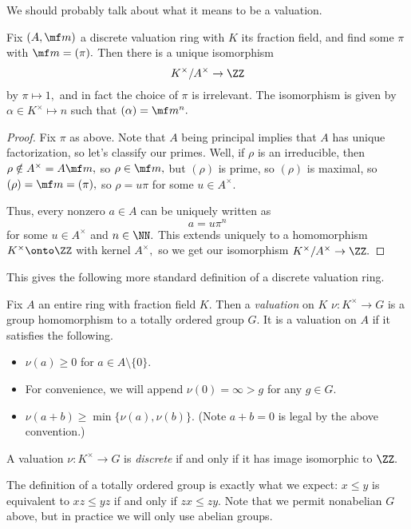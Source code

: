 \documentclass[../notes.tex]{subfiles}
\begin{document}
We should probably talk about what it means to be a valuation.
\begin{proposition} \label{prop:forwards}
    Fix $(A,\mf m)$ a discrete valuation ring with $K$ its fraction field, and find some $\pi$ with $\mf m=(\pi).$ Then there is a unique isomorphism
    \[K^\times/A^\times\to\ZZ\]
    by $\pi\mapsto1,$ and in fact the choice of $\pi$ is irrelevant. The isomorphism is given by $\alpha\in K^\times\longmapsto n$ such that $(\alpha)=\mf m^{n}.$
\end{proposition}
\begin{proof}
    Fix $\pi$ as above. Note that $A$ being principal implies that $A$ has unique factorization, so let's classify our primes. Well, if $\rho$ is an irreducible, then $\rho\notin A^\times=A\mf m,$ so $\rho\in\mf m,$ but $(\rho)$ is prime, so $(\rho)$ is maximal, so $(\rho)=\mf m=(\pi),$ so $\rho=u\pi$ for some $u\in A^\times.$

    Thus, every nonzero $a\in A$ can be uniquely written as
    \[a=u\pi^n\]
    for some $u\in A^\times$ and $n\in\NN.$ This extends uniquely to a homomorphism $K^\times\onto\ZZ$ with kernel $A^\times,$ so we get our isomorphism $K^\times/A^\times\to\ZZ.$
\end{proof}
This gives the following more standard definition of a discrete valuation ring.
\begin{definition}[Valuation]
    Fix $A$ an entire ring with fraction field $K.$ Then a \textit{valuation} on $K$ $\nu:K^\times\to G$ is a group homomorphism to a totally ordered group $G.$ It is a valuation on $A$ if it satisfies the following.
    \begin{itemize}
        \item $\nu(a)\ge0$ for $a\in A\setminus\{0\}.$
        \item For convenience, we will append $\nu(0)=\infty>g$ for any $g\in G.$
        \item $\nu(a+b)\ge\min\{\nu(a),\nu(b)\}.$ (Note $a+b=0$ is legal by the above convention.)
    \end{itemize}
    A valuation $\nu:K^\times\to G$ is \textit{discrete} if and only if it has image isomorphic to $\ZZ.$
\end{definition}
The definition of a totally ordered group is exactly what we expect: $x\le y$ is equivalent to $xz\le yz$ if and only if $zx\le zy.$ Note that we permit nonabelian $G$ above, but in practice we will only use abelian groups.
\end{document}
